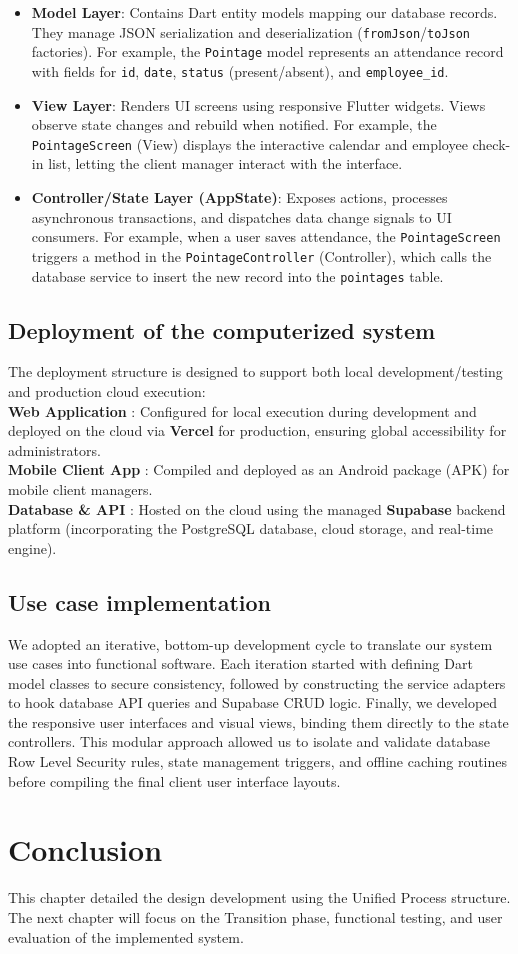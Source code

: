 \begin{itemize}
    \item \textbf{Model Layer}: Contains Dart entity models mapping our database records. They manage JSON serialization and deserialization (\texttt{fromJson}/\texttt{toJson} factories). For example, the \texttt{Pointage} model represents an attendance record with fields for \texttt{id}, \texttt{date}, \texttt{status} (present/absent), and \texttt{employee\_id}.
    \item \textbf{View Layer}: Renders UI screens using responsive Flutter widgets. Views observe state changes and rebuild when notified. For example, the \texttt{PointageScreen} (View) displays the interactive calendar and employee check-in list, letting the client manager interact with the interface.
    \item \textbf{Controller/State Layer (AppState)}: Exposes actions, processes asynchronous transactions, and dispatches data change signals to UI consumers. For example, when a user saves attendance, the \texttt{PointageScreen} triggers a method in the \texttt{PointageController} (Controller), which calls the database service to insert the new record into the \texttt{pointages} table.
\end{itemize}

\subsection{Deployment of the computerized system}
The deployment structure is designed to support both local development/testing and production cloud execution:
\\
\textbf{Web Application} : Configured for local execution during development and deployed on the cloud via \textbf{Vercel} \cite{VercelDocs} for production, ensuring global accessibility for administrators.
\\
\textbf{Mobile Client App} : Compiled and deployed as an Android package (APK) for mobile client managers.
\\
\textbf{Database \& API} : Hosted on the cloud using the managed \textbf{Supabase} \cite{SupabaseDocs} backend platform (incorporating the PostgreSQL database, cloud storage, and real-time engine).

\subsection{Use case implementation}
We adopted an iterative, bottom-up development cycle to translate our system use cases into functional software. Each iteration started with defining Dart model classes to secure consistency, followed by constructing the service adapters to hook database API queries and Supabase CRUD logic. Finally, we developed the responsive user interfaces and visual views, binding them directly to the state controllers. This modular approach allowed us to isolate and validate database Row Level Security rules, state management triggers, and offline caching routines before compiling the final client user interface layouts.

\section{Conclusion}
This chapter detailed the design development using the Unified Process structure. The next chapter will focus on the Transition phase, functional testing, and user evaluation of the implemented system.
